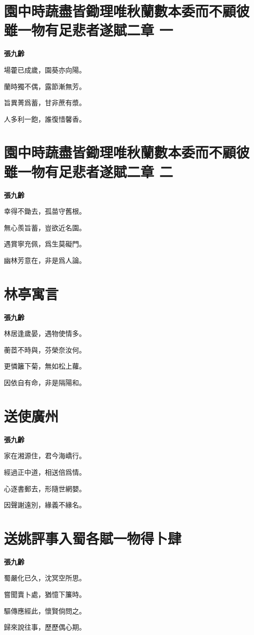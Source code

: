 \documentclass[12pt,a4paper]{ctexbook}
\begin{document}
\section{園中時蔬盡皆鋤理唯秋蘭數本委而不顧彼雖一物有足悲者遂賦二章 一}
\textbf{張九齡}\par\vspace{0.5em}
場藿已成歲，園葵亦向陽。\par
蘭時獨不偶，露節漸無芳。\par
旨異菁爲蓄，甘非蔗有漿。\par
人多利一飽，誰復惜馨香。\par

\section{園中時蔬盡皆鋤理唯秋蘭數本委而不顧彼雖一物有足悲者遂賦二章 二}
\textbf{張九齡}\par\vspace{0.5em}
幸得不鋤去，孤苗守舊根。\par
無心羨旨蓄，豈欲近名園。\par
遇賞寧充佩，爲生莫礙門。\par
幽林芳意在，非是爲人論。\par

\section{林亭寓言}
\textbf{張九齡}\par\vspace{0.5em}
林居逢歲晏，遇物使情多。\par
蘅茝不時與，芬榮奈汝何。\par
更憐籬下菊，無如松上蘿。\par
因依自有命，非是隔陽和。\par

\section{送使廣州}
\textbf{張九齡}\par\vspace{0.5em}
家在湘源住，君今海嶠行。\par
經過正中道，相送倍爲情。\par
心逐書郵去，形隨世網嬰。\par
因聲謝遠別，緣義不緣名。\par

\section{送姚評事入蜀各賦一物得卜肆}
\textbf{張九齡}\par\vspace{0.5em}
蜀嚴化已久，沈冥空所思。\par
嘗聞賣卜處，猶憶下簾時。\par
驅傳應經此，懷賢倘問之。\par
歸來說往事，歷歷偶心期。\par
\end{document}
